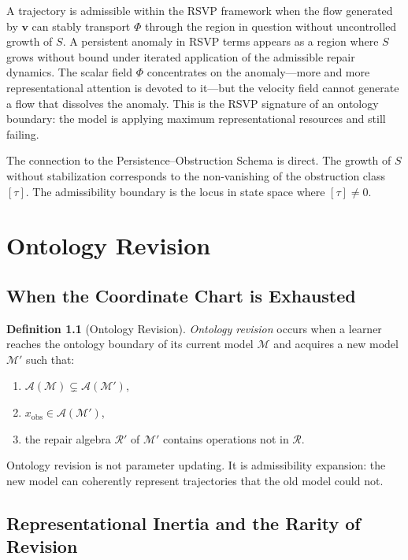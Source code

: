 \documentclass[12pt,oneside]{book}
\theoremstyle{plain}
\theoremstyle{definition}
\newtheorem{definition}[theorem]{Definition}
\theoremstyle{remark}
\newcommand{\R}{\mathcal{R}}
\newcommand{\M}{\mathcal{M}}
\newcommand{\1}{\mathbf{1}}
\begin{document}
A trajectory is admissible within the RSVP framework when the flow generated by $\mathbf{v}$ can stably transport $\Phi$ through the region in question without uncontrolled growth of $S$. A persistent anomaly in RSVP terms appears as a region where $S$ grows without bound under iterated application of the admissible repair dynamics. The scalar field $\Phi$ concentrates on the anomaly---more and more representational attention is devoted to it---but the velocity field cannot generate a flow that dissolves the anomaly. This is the RSVP signature of an ontology boundary: the model is applying maximum representational resources and still failing.

The connection to the Persistence--Obstruction Schema is direct. The growth of $S$ without stabilization corresponds to the non-vanishing of the obstruction class $[\tau]$. The admissibility boundary is the locus in state space where $[\tau] \neq 0$.


\chapter{Ontology Revision}

\section{When the Coordinate Chart is Exhausted}

\begin{definition}[Ontology Revision]
\emph{Ontology revision} occurs when a learner reaches the ontology boundary of its current model $\M$ and acquires a new model $\M'$ such that:
\begin{enumerate}[label=(\roman*)]
\item $\mathcal{A}(\M) \subsetneq \mathcal{A}(\M')$,
\item $x_{\mathrm{obs}} \in \mathcal{A}(\M')$,
\item the repair algebra $\R'$ of $\M'$ contains operations not in $\R$.
\end{enumerate}
\end{definition}

Ontology revision is not parameter updating. It is admissibility expansion: the new model can coherently represent trajectories that the old model could not.

\section{Representational Inertia and the Rarity of Revision}
\end{document}
